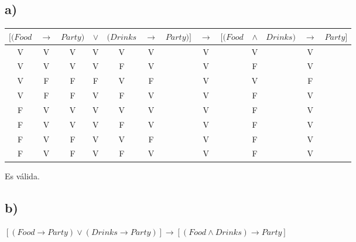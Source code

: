 \documentclass[spanish]{article}
\begin{document}
\subsection*{ a)}
\begin{tabular}{ccccccccccccc}
  $[(Food$ & $\rightarrow$ & $Party)$ & $\vee$ & $(Drinks$ & $\rightarrow$ & $Party)]$ & $\rightarrow$ & $[(Food$ & $\wedge$ & $Drinks)$ & $\rightarrow$ & $Party]$ \\\hline
  V        & V             & V        & V      & V         & V             &           & V             &          & V        &           & V                        \\
  V        & V             & V        & V      & F         & V             &           & V             &          & F        &           & V                        \\
  V        & F             & F        & F      & V         & F             &           & V             &          & V        &           & F                        \\
  V        & F             & F        & V      & F         & V             &           & V             &          & F        &           & V                        \\
  F        & V             & V        & V      & V         & V             &           & V             &          & F        &           & V                        \\
  F        & V             & V        & V      & F         & V             &           & V             &          & F        &           & V                        \\
  F        & V             & F        & V      & V         & F             &           & V             &          & F        &           & V                        \\
  F        & V             & F        & V      & F         & V             &           & V             &          & F        &           & V                        \\
\end{tabular}

Es válida.

\subsection*{ b)}

$[(Food \rightarrow Party)\vee(Drinks\rightarrow Party)] \rightarrow [(Food \wedge Drinks)\rightarrow Party]$
\end{document}
